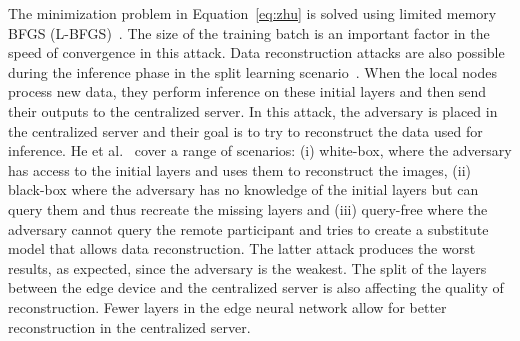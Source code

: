 The minimization problem in Equation~\ref{eq:zhu} is solved using limited memory BFGS (L-BFGS)~. 
The size of the training batch is an important factor in the speed of convergence in this attack.
Data reconstruction attacks are also possible during the inference phase in the split learning scenario~. When the local nodes process new data, they perform inference on these initial layers and then send their outputs to the centralized server. In this attack, the adversary is placed in the centralized server and their goal is to try to reconstruct the data used for inference. He et al.~ cover a range of scenarios: (i) white-box, where the adversary has access to the initial layers and uses them to reconstruct the images, (ii) black-box where the adversary has no knowledge of the initial layers but can query them and thus recreate the missing layers and (iii) query-free where the adversary cannot query the remote participant and tries to create a substitute model that allows data reconstruction. The latter attack produces the worst results, as expected, since the adversary is the weakest. The split of the layers between the edge device and the centralized server is also affecting the quality of reconstruction. Fewer layers in the edge neural network allow for better reconstruction in the centralized server.

